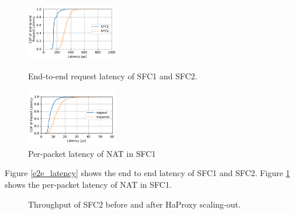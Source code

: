 \begin{figure}   
  \begin{minipage}[t]{0.47\columnwidth}  
    \centering
    \includegraphics[width=4.0cm]{fig/e2e_latency_chain12.pdf}  
     
    \caption{\small{End-to-end request latency of SFC1 and SFC2.}}  
    \label{e2e_latency}   
  \end{minipage}%
  \hfill 
  \hfill 
  \begin{minipage}[t]{0.47\columnwidth}
    \centering   
    \includegraphics[width=4.0cm]{fig/cdf_chain1.pdf}   
    \caption{\small{Per-packet latency of NAT in SFC1}}  
    \label{nat_latency}   
  \end{minipage}  

\end{figure}

Figure \ref{e2e_latency} shows the end to end latency of SFC1 and SFC2. 
Figure \ref{nat_latency} shows the per-packet latency of NAT in SFC1. 


\begin{figure}[!t]
\centering
{}
\hfil
{}
\hfil
\caption{Throughput of SFC2 before and after HaProxy scaling-out.}
\label{throughput}
\end{figure}


